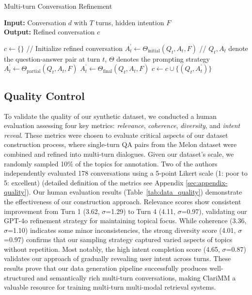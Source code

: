 \documentclass[11pt]{article}
\begin{document}
\begin{algorithm}[!t]
\small
\caption{Multi-turn Conversation Refinement}
\label{alg:refine_conversation}
\textbf{Input:} Conversation $d$ with $T$ turns, hidden intention $F$ \\
\textbf{Output:} Refined conversation $c$

\begin{algorithmic}[1]
\State $c \gets \{\}$ // Initialize refined conversation
        \State $A_t^{\text{'}} \gets \Theta_{\text{initial}}(Q_t, A_t, F)$ // $Q_t,A_t$ denote the question-answer pair at turn $t$, $\Theta$ denotes the prompting strategy
        \State $A_t^{\text{'}} \gets \Theta_{\text{partial}}(Q_t, A_t, F)$ 
    \Else
        \State $A_t^{\text{'}} \gets \Theta_{\text{final}}(Q_t, A_t, F)$ 
    \EndIf
    \State $c \gets c \cup \{(Q_t, A_t^{\text{'}})\}$

\EndFor
\end{algorithmic}
\end{algorithm}













\subsection{Quality Control}

To validate the quality of our synthetic dataset, we conducted a human evaluation assessing four key metrics: \textit{relevance}, \textit{coherence}, \textit{diversity}, and \textit{intent reveal}. These metrics were chosen to evaluate critical aspects of our dataset construction process, where single-turn QA pairs from the Melon dataset \cite{yuan2024askingmultimodalclarifyingquestions} were combined and refined into multi-turn dialogues.
Given our dataset's scale, we randomly sampled 10\% of the topics for annotation. Two of the authors independently evaluated 178 conversations using a 5-point Likert scale (1: poor to 5: excellent) (detailed definition of the metrics see Appendix \ref{sec:appendix-quality}).
Our human evaluation results (Table~\ref{tab:data_quality}) demonstrate the effectiveness of our construction approach. Relevance scores show consistent improvement from Turn 1 (3.62, $\sigma$=1.29) to Turn 4 (4.11, $\sigma$=0.97), validating our GPT-4o refinement strategy for maintaining topical focus. While coherence (3.36, $\sigma$=1.10) indicates some minor inconsistencies, the strong diversity score (4.01, $\sigma$=0.97) confirms that our sampling strategy captured varied aspects of topics without repetition. Most notably, the high intent completion score (4.65, $\sigma$=0.87) validates our approach of gradually revealing user intent across turns.
These results prove that our data generation pipeline successfully produces well-structured and semantically rich multi-turn conversations, making ClariMM a valuable resource for training multi-turn multi-modal retrieval systems.
\end{document}
